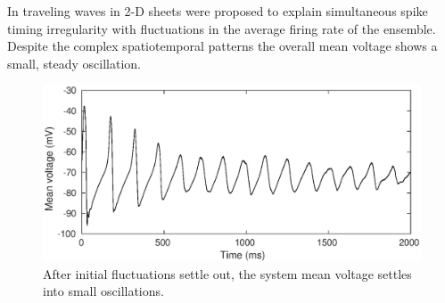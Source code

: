 In \citet{keane2015} traveling waves in 2-D sheets were proposed to explain simultaneous spike timing irregularity with fluctuations in the average firing rate of the ensemble. 
Despite the complex spatiotemporal patterns the overall mean voltage shows a small, steady oscillation.
\begin{figure}[!htb]
 \caption{ After initial fluctuations settle out, the system mean voltage settles into small oscillations.}
 \label{fig:2D_mean_voltage}
 \centering
   \includegraphics[width=\textwidth]{fig/MeanVoltage_PBC}
\end{figure}

\FloatBarrier

